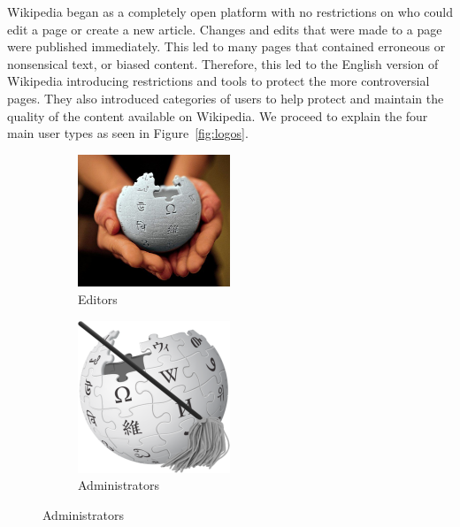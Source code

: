 Wikipedia began as a completely open platform with no restrictions on who could edit a page or create a new article.
Changes and edits that were made to a page were published immediately.
This led to many pages that contained erroneous or nonsensical text, or biased content.
Therefore, this led to the English version of Wikipedia introducing restrictions and tools to protect the more controversial pages.
They also introduced categories of users to help protect and maintain the quality of the content available on Wikipedia.
We proceed to explain the four main user types as seen in Figure~\ref{fig:logos}. 
\begin{figure}[h!]
    \centering
    \begin{subfigure}[b]{0.49\textwidth}
        \centering
        \includegraphics[width=0.5\textwidth]{images/wikipedians.pdf}
        \caption{Editors}
        \label{fig:editors}
    \end{subfigure}
    \begin{subfigure}[b]{0.49\textwidth}
        \centering
        \includegraphics[width=0.5\textwidth]{images/admins.pdf}
        \caption{Administrators}
        \label{fig:admins}
    \end{subfigure}


\end{figure}
